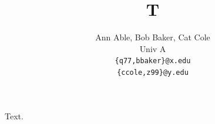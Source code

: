 \documentclass{article}
\title{T}
\author{Ann Able, Bob Baker, Cat Cole \\ Univ A \\ \texttt{\{q77,bbaker\}@x.edu} \\ \texttt{\{ccole,z99\}@y.edu}}
\begin{document}
\maketitle
Text.
\end{document}
